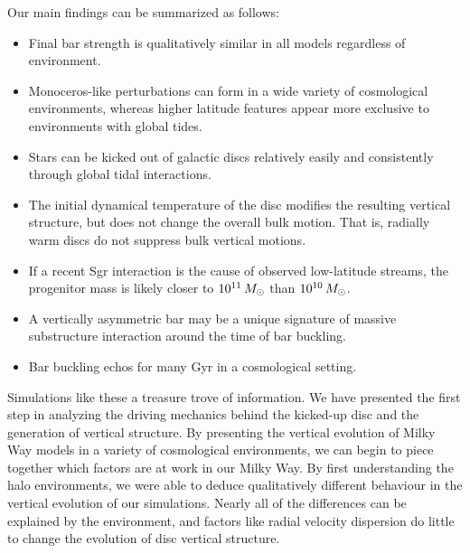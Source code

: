 Our main findings can be summarized as follows:
\begin{itemize}
\item Final bar strength is qualitatively similar in all models regardless of environment.
\item Monoceros-like perturbations can form in a wide variety of cosmological environments, whereas higher latitude features appear more exclusive to environments with global tides.
\item Stars can be kicked out of galactic discs relatively easily and consistently through global tidal interactions.
\item The initial dynamical temperature of the disc modifies the resulting vertical structure, but does not change the overall bulk motion. That is, radially warm discs do not suppress bulk vertical motions.
\item If a recent Sgr interaction is the cause of observed low-latitude streams, the progenitor mass is likely closer to $10^{11} \,M_\odot$ than $10^{10} \,M_\odot$.
\item A vertically asymmetric bar may be a unique signature of massive substructure interaction around the time of bar buckling.
\item Bar buckling echos for many Gyr in a cosmological setting.
\end{itemize}

Simulations like these a treasure trove of information. We have presented the first step in analyzing the driving mechanics behind the kicked-up disc and the generation of vertical structure. By presenting the vertical evolution of Milky Way models in a variety of cosmological environments, we can begin to piece together which factors are at work in our Milky Way. By first understanding the halo environments, we were able to deduce qualitatively different behaviour in the vertical evolution of our simulations. Nearly all of the differences can be explained by the environment, and factors like radial velocity dispersion do little to change the evolution of disc vertical structure.

